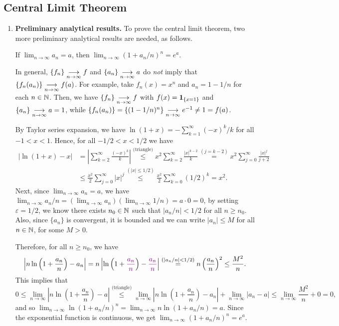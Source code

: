 \subsection{Central Limit Theorem}
\label{subsect:clt}
\begin{enumerate}
\item \textbf{Preliminary analytical results.} To prove the central limit
theorem, two more preliminary analytical results are needed, as follows.
\begin{lemma}
\label{lma:conv-expo}
If \(\lim_{n\to\infty}a_n=a\), then \(\lim_{n\to\infty}(1+a_n/n)^{n}=e^{a}\).
\end{lemma}
\begin{warning}
In general, \(\{f_n\}\underset{n\to\infty}{\overset{}{\longrightarrow}}f\) and \(\{a_n\}\underset{n\to\infty}{\overset{}{\longrightarrow}}a\) do \emph{not} imply
that \(\{f_n(a_n)\}\underset{n\to\infty}{\overset{}{\longrightarrow}}f(a)\). For example, take \(f_n(x)=x^{n}\) and
\(a_n=1-1/n\) for each \(n\in\mathbb{N}\). Then, we have \(\{f_n\}\underset{n\to\infty}{\overset{}{\longrightarrow}}f\) with
\(f(x)=\mathbf{1}_{\left\{x=1\right\}}\) and \(\{a_n\}\underset{n\to\infty}{\overset{}{\longrightarrow}}a=1\), while \(\{f_n(a_n)\}
=\{(1-1/n)^{n}\}\underset{n\to\infty}{\overset{}{\longrightarrow}}e^{-1}\ne 1=f(a)\).
\end{warning}

\begin{pf}
By Taylor series expansion, we have \(\ln(1+x)=-\sum_{k=1}^{\infty}(-x)^{k}/k\)
for all \(-1<x<1\). Hence, for all \(-1/2<x<1/2\) we have
\begin{align*}
|\ln (1+x)-x|&=\left|\sum_{k=2}^{\infty}\frac{(-x)^{k}}{k}\right|
\overset{\text{(triangle)}}{\le}
x^{2}\sum_{k=2}^{\infty}\frac{|x|^{k-2}}{k}
\overset{(j=k-2)}{=}x^{2}\sum_{j=0}^{\infty}\frac{|x|^{j}}{j+2} \\
&\le \frac{x^{2}}{2}\sum_{j=0}^{\infty}|x|^{j}
\overset{(|x|\le 1/2)}{\le}
\frac{x^{2}}{2}\sum_{k=0}^{\infty}(1/2)^{k}=x^{2}.
\end{align*}
Next, since \(\lim_{n\to\infty}a_n=a\), we have \(\lim_{n\to\infty}a_n/n
=(\lim_{n\to\infty}a_n)(\lim_{n\to\infty}1/n)=a\cdot 0=0\), by setting
\(\varepsilon=1/2\), we know there exists \(n_0\in\mathbb{N}\) such that
\(|a_n/n|<1/2\) for all \(n\ge n_{0}\). Also, since \(\{a_n\}\) is convergent,
it is bounded and we can write \(|a_n|\le M\) for all \(n\in\mathbb{N}\), for some
\(M>0\).

Therefore, for all \(n\ge n_{0}\), we have
\[
\left|n\ln\left(1+\frac{a_n}{n}\right)-a_n\right|
=n\left|\ln\left(1+\vc{\frac{a_n}{n}}\right)-\vc{\frac{a_n}{n}}\right|
\overset{(|a_n/n|<1/2)}{=}
n\left(\frac{a_n}{n}\right)^{2}
\le \frac{M^{2}}{n}.
\]
This implies that
\[
0\le
\lim_{n\to\infty}\left|n\ln\left(1+\frac{a_n}{n}\right)-a\right|
\overset{\text{(triangle)}}{\le}
\lim_{n\to\infty}\left|n\ln\left(1+\frac{a_n}{n}\right)-a_n\right|
+\lim_{n\to\infty}|a_n-a|
\le\lim_{n\to\infty}\frac{M^{2}}{n}+0
=0,
\]
and so \(\lim_{n\to\infty}\ln(1+a_n/n)^{n}=
\lim_{n\to\infty}n\ln(1+a_n/n)=a\). Since the exponential
function is continuous, we get \(\lim_{n\to\infty}(1+a_n/n)^{n}=e^{a}\).
\end{pf}


\end{enumerate}
